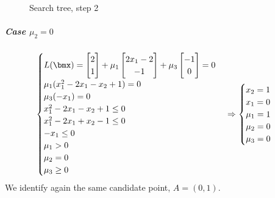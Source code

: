 \documentclass[\main/main.tex]{subfiles}
\begin{document}
\begin{figure}
  \caption{Search tree, step 2}
\end{figure}

\subparagraph*{Case $\mu_2=0$}

\[
  \begin{cases}
    L(\bmx) = \begin{bmatrix}
      2 \\
      1
    \end{bmatrix} + \mu_1 \begin{bmatrix}
      2x_1 -2 \\
      -1
    \end{bmatrix} + \mu_3 \begin{bmatrix}
      -1 \\
      0
    \end{bmatrix} = 0 \\
    \mu_1(x_1^2 - 2x_1 - x_2 + 1) = 0                                                                              \\
    \mu_3(-x_1                  ) = 0                                                                              \\
    x_1^2 - 2x_1 - x_2 + 1          \leq 0                                                                         \\
    x_1^2 - 2x_1 + x_2 -1           \leq 0                                                                         \\
    -x_1                            \leq 0                                                                         \\
    \mu_1 > 0                                                                                                      \\
    \mu_2 = 0                                                                                                      \\
    \mu_3 \geq 0
  \end{cases}
  \Rightarrow
  \begin{cases}
    x_2 = 1   \\
    x_1 = 0   \\
    \mu_1 = 1 \\
    \mu_2 = 0 \\
    \mu_3 = 0
  \end{cases}
\]
We identify again the same candidate point, $A = (0,1)$.
\end{document}
